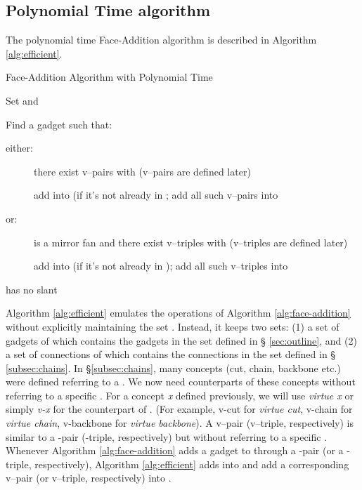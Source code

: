 \documentclass[11pt]{article}
\begin{document}
\subsection{Polynomial Time algorithm}\label{sec:algorithm}

The polynomial time Face-Addition algorithm is described in
Algorithm \ref{alg:efficient}.

\begin{algorithm}[ht]
\caption{Face-Addition Algorithm with Polynomial Time}
\label{alg:efficient}





Set  and \;

{
Find a gadget  such that:\

\begin{description}
\item [either:] there exist v--pairs 
with  (v--pairs are defined later)\;

add  into  (if it's not already in
; add all such v--pairs  into \;

\item[or:]  is a mirror fan and there exist v--triples
 with  (v--triples
are defined later)\;

add  into  (if it's not already
in ); add all such v--triples  into \;
\end{description}
}

{
 has no slant \;
}
\end{algorithm}

Algorithm \ref{alg:efficient} emulates the operations of Algorithm
\ref{alg:face-addition} without explicitly maintaining the set .
Instead, it keeps two sets: (1) a set  of gadgets of 
which contains the gadgets in the set  defined in \S
\ref{sec:outline}, and (2) a set  of connections of 
which contains the connections in the set  defined in \S
\ref{subsec:chains}.
In \S \ref{subsec:chains}, many concepts (cut, chain, backbone  etc.)
were defined referring to a .
We now need counterparts of these concepts without referring to
a specific . For a concept {\em x} defined previously, we will use
{\em virtue x} or simply {\em v-x} for the counterpart of .
(For example, v-cut for {\em virtue cut}, v-chain for {\em virtue chain},
v-backbone for {\em virtue backbone}).
A v--pair (v--triple, respectively) is similar to a -pair
(-triple, respectively) but without referring to a specific .
Whenever Algorithm \ref{alg:face-addition} adds a gadget  to
 through a -pair (or a -triple, respectively),
Algorithm \ref{alg:efficient} adds  into  and add a
corresponding v--pair (or v--triple, respectively) into .
\end{document}
